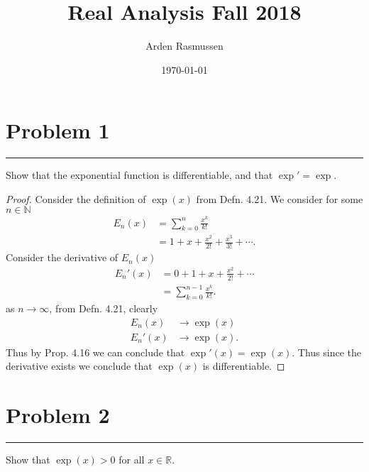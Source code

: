 \documentclass[12pt]{amsart}
\title{Real Analysis Fall 2018}
\author{Arden Rasmussen}
\date{\today}
\newcommand{\usec}[1]{%
  \section*{#1}%
  \noindent\rule{\textwidth}{2pt}%
  \vspace{10pt}%
}
\newcommand{\prop}[1]{Prop. #1}
\newcommand{\defn}[1]{Defn. #1}
\newcommand{\N}{\mathbb{N}}
\newcommand{\R}{\mathbb{R}}
\begin{document}
\maketitle

\usec{Problem 1}%
\label{sec:problem_1}

Show that the exponential function is differentiable, and that $\exp'=\exp$.

\begin{proof}
  Consider the definition of $\exp(x)$ from \defn{4.21}. We consider for some
  $n\in\N$
  \begin{align*}
    E_n(x)&=\sum_{k=0}^n\frac{x^k}{k!}\\
          &=1+x+\frac{x^2}{2!}+\frac{x^3}{3!}+\cdots.
  \end{align*}
  Consider the derivative of $E_n(x)$
  \begin{align*}
    E_n'(x)&=0+1+x+\frac{x^2}{2!}+\cdots\\
           &=\sum_{k=0}^{n-1}\frac{x^k}{k!}.
  \end{align*}
  as $n\to\infty$, from \defn{4.21}, clearly
  \begin{align*}
    E_n(x)&\to\exp(x)\\
    E_n'(x)&\to\exp(x).
  \end{align*}
  Thus by \prop{4.16} we can conclude that $\exp'(x)=\exp(x)$. Thus since the
  derivative exists we conclude that $\exp(x)$ is differentiable.
\end{proof}

\usec{Problem 2}%
\label{sec:problem_2}

Show that $\exp(x)>0$ for all $x\in \R$.
\end{document}
